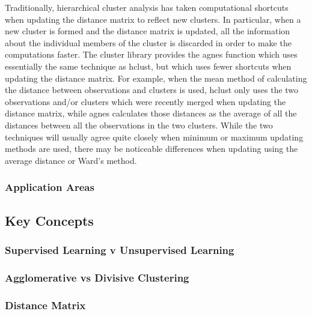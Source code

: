 Traditionally, hierarchical cluster analysis has taken computational shortcuts when updating the distance matrix to reflect new clusters. In particular, when a new cluster is formed and the distance matrix is updated, all the information about the individual members of the cluster is discarded in order to make the computations faster. The cluster library provides the agnes function which uses essentially the same technique as hclust, but which uses fewer shortcuts when updating the distance matrix. For example, when the mean method of calculating the distance between observations and clusters is used, hclust only uses the two observations and/or clusters which were recently merged when updating the distance matrix, while agnes calculates those distances as the average of all the distances between all the observations in the two clusters. While the two techniques will usually agree quite closely when minimum or maximum updating methods are used, there may be noticeable differences when updating using the average distance or Ward's method.

\subsubsection{Application Areas}

\newpage
\subsection{Key Concepts}


\subsubsection{Supervised Learning v Unsupervised Learning}

\subsubsection{Agglomerative vs Divisive Clustering}
\subsubsection{Distance Matrix}

\newpage
